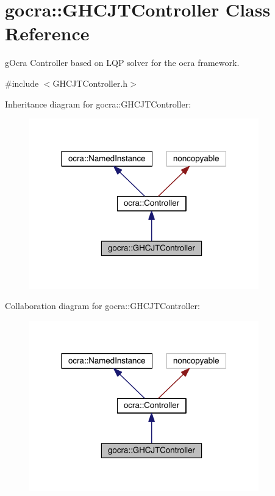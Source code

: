 \hypertarget{classgocra_1_1GHCJTController}{}\section{gocra\+:\+:G\+H\+C\+J\+T\+Controller Class Reference}
\label{classgocra_1_1GHCJTController}


g\+Ocra Controller based on L\+QP solver for the ocra framework.  




{\ttfamily \#include $<$G\+H\+C\+J\+T\+Controller.\+h$>$}



Inheritance diagram for gocra\+:\+:G\+H\+C\+J\+T\+Controller\+:\nopagebreak
\begin{figure}[H]
\begin{center}
\leavevmode
\includegraphics[width=282pt]{dd/d8e/classgocra_1_1GHCJTController__inherit__graph}
\end{center}
\end{figure}


Collaboration diagram for gocra\+:\+:G\+H\+C\+J\+T\+Controller\+:\nopagebreak
\begin{figure}[H]
\begin{center}
\leavevmode
\includegraphics[width=282pt]{dd/d5b/classgocra_1_1GHCJTController__coll__graph}
\end{center}
\end{figure}
